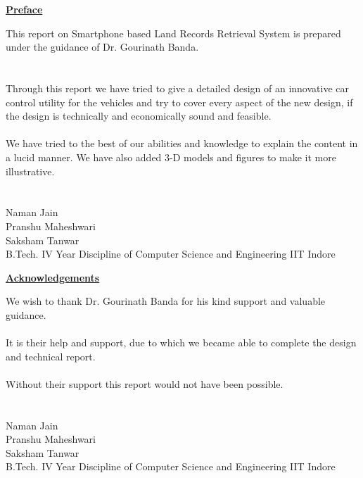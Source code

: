 \documentclass{article}
\begin{document}
{
    \begin{center}
        \textbf{\underline{\large{Preface}}}
    \end{center}
    This report on Smartphone based Land Records Retrieval System is prepared under the guidance of Dr. Gourinath Banda.\\
    \\
    \\
    Through this report we have tried to give a detailed design of an innovative car control utility for the vehicles and try to cover every aspect of the new design, if the design is technically and economically sound and feasible.\\
    \\
    We have tried to the best of our abilities and knowledge to explain the content in a lucid manner. We have also added 3-D models and figures to make it more illustrative.\\
    \\
    \\
    Naman Jain\\
    Pranshu Maheshwari\\
    Saksham Tanwar\\
    B.Tech. IV Year
    Discipline of Computer Science and Engineering
    IIT Indore 


    \thispagestyle{empty}
}

\clearpage


{
    \begin{center}
        \textbf{\underline{\large{Acknowledgements}}}
    \end{center}
    We wish to thank Dr. Gourinath Banda for his kind support and valuable guidance.\\
    \\
    It is their help and support, due to which we became able to complete the design and technical report.\\
    \\
    Without their support this report would not have been possible.\\
    \\
    \\
    Naman Jain\\
    Pranshu Maheshwari\\
    Saksham Tanwar\\
    B.Tech. IV Year
    Discipline of Computer Science and Engineering
    IIT Indore 
    \thispagestyle{empty}
}
\end{document}
